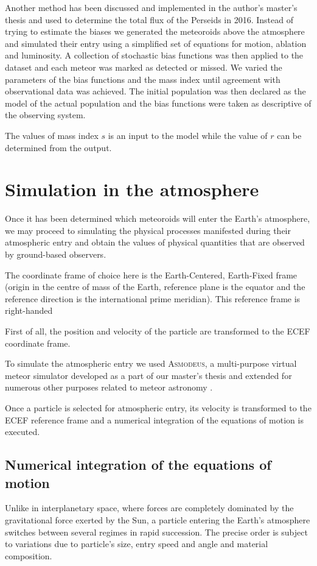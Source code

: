     Another method has been discussed and implemented in the author's master's thesis \citep{balaz-thesis}
    and used to determine the total flux of the Perseids in 2016. Instead of trying to
    estimate the biases we generated the meteoroids above the atmosphere and simulated
    their entry using a simplified set of equations for motion, ablation and luminosity.
    A collection of stochastic bias functions was then applied to the dataset and
    each meteor was marked as detected or missed. We varied the parameters of the bias functions
    and the mass index until agreement with observational data was achieved.
    The initial population was then declared as the model of the actual population
    and the bias functions were taken as descriptive of the observing system.

    The values of mass index $s$ is an input to the model while the value of $r$
    can be determined from the output.


\section{Simulation in the atmosphere} \label{ma}
    Once it has been determined which meteoroids will enter the Earth's atmosphere, we may proceed to simulating
    the physical processes manifested during their atmospheric entry and obtain the values of physical quantities
    that are observed by ground-based observers.

    The coordinate frame of choice here is the Earth-Centered, Earth-Fixed frame (origin in the centre of mass of the Earth,
    reference plane is the equator and the reference direction is the international prime meridian).
    This reference frame is right-handed

    First of all, the position and velocity of the particle are transformed to the ECEF coordinate frame.

    To simulate the atmospheric entry we used \textsc{Asmodeus},
    a multi-purpose virtual meteor simulator developed as a part of our master's thesis and extended for numerous
    other purposes related to meteor astronomy \citep{balaz-thesis,balaz+2020}.

    Once a particle is selected for atmospheric entry, its velocity is transformed to the ECEF reference frame
    and a numerical integration of the equations of motion is executed.

    \subsection{Numerical integration of the equations of motion} \label{sai}
        Unlike in interplanetary space, where forces are completely dominated by the gravitational force exerted by the Sun,
        a particle entering the Earth's atmosphere switches between several regimes in rapid succession.
        The precise order is subject to variations due to particle's size, entry speed and angle
        and material composition.



